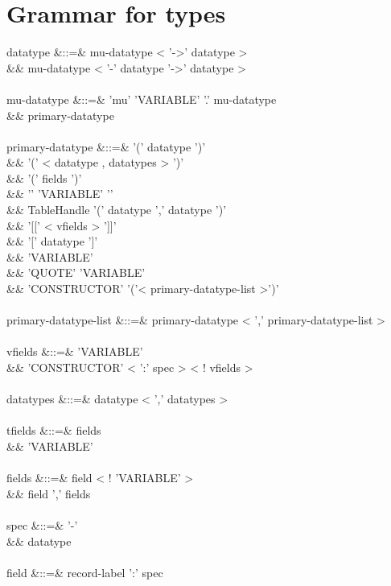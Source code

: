 \documentclass[11pt,a4paper]{article}
\begin{document}
\section{Grammar for types}

\begin{grammar}
datatype &::=& mu-datatype < '->' datatype > \\
&&             mu-datatype < '-{' datatype '}->' datatype > \\
\\
mu-datatype &::=& 'mu' 'VARIABLE' '.' mu-datatype \\
&&                primary-datatype \\
\\
primary-datatype &::=& '(' datatype ')' \\
&&                     '(' < datatype , datatypes > ')' \\
&&                     '(' fields ')' \\
&&                     '{' 'VARIABLE' '}' \\
&&                     TableHandle '(' datatype ',' datatype ')' \\
&&                     '[[' < vfields > ']]' \\
&&                     '[' datatype ']' \\
&&                     'VARIABLE' \\
&&                     'QUOTE' 'VARIABLE' \\
&&                     'CONSTRUCTOR' '('< primary-datatype-list >')' \\
\\
primary-datatype-list &::=& primary-datatype < ',' primary-datatype-list > \\
\\
vfields &::=&  'VARIABLE'  \\
&&             'CONSTRUCTOR' < ':' spec >  < ! vfields > \\
\\
datatypes &::=& datatype < ',' datatypes > \\
\\
tfields &::=& fields \\
&&            'VARIABLE' \\
\\
fields &::=&  field < ! 'VARIABLE' >  \\
&&            field ',' fields \\
\\
spec &::=& '-' \\
&&         datatype \\
\\
field &::=& record-label ':' spec \\
\end{grammar}
\end{document}
